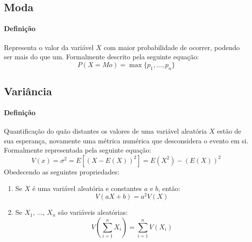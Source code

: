 \documentclass{article}
\begin{document}
        \subsection{Moda}
            \paragraph{Definição}Representa o valor da variável $X$ com maior probabilidade de ocorrer, podendo ser mais do que um. Formalmente descrito pela seguinte equação:
                \begin{equation}
                    \boxed{
                        P(X = Mo) = \max\{ p_{1}, ..., p_{n} \}
                    }
                \end{equation}

        \subsection{Variância}
            \paragraph{Definição}Quantificação do quão distantes os valores de uma variável aleatória $X$ estão de sua esperança, novamente uma métrica numérica que desconsidera o evento em si. Formalmente representada pela seguinte equação:
                \begin{equation}
                    \boxed{
                        V(x) = \sigma^{2} = 
                        E[(X - E(X))^{2}] =
                        E(X^{2}) - (E(X))^{2}
                    }
                \end{equation}
            Obedecendo as seguintes propriedades:
                \begin{enumerate}[rightmargin = \leftmargin, noitemsep]
                    \item Se $X$ é uma variável aleatória e constantes $a$ e $b$, então:
                        \begin{equation}
                            \boxed{
                                V(a X + b) = a^{2} V(X)
                            }
                        \end{equation}
                    \item Se $X_{1}$, ..., $X_{n}$ são variáveis aleatórias:
                        \begin{equation}
                            \boxed{
                                V \left( \sum_{i=1}^{n} X_{i} \right) = \sum_{i=1}^{n} V(X_{i})
                            }
                        \end{equation}
                \end{enumerate}
\end{document}
